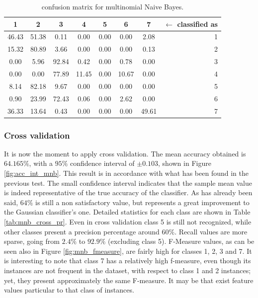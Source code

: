 \documentclass[a4paper, 10pt]{article}
\begin{document}
\begin{table}[H]
\centering
\begin{tabular}{|*{7}{c|}r|}
\hline

1 &2 &3 &4 &5 &6 &7 & $\leftarrow$ classified as \\\hline

\cellcolor{black!15}46.43 &51.38 &0.11 &0.00 &0.00 &0.00 &2.08 & 1 \\\hline

15.32 &\cellcolor{black!15}80.89 &3.66 &0.00 &0.00 &0.00 &0.13 & 2 \\\hline

0.00 &5.96 &\cellcolor{black!15}92.84 &0.42 &0.00 &0.78 &0.00 & 3 \\\hline

0.00 &0.00 &77.89 &\cellcolor{black!15}11.45 &0.00 &10.67 &0.00 & 4 \\\hline

8.14 &82.18 &9.67 &0.00 &\cellcolor{black!15}0.00 &0.00 &0.00 & 5 \\\hline

0.90 &23.99 &72.43 &0.06 &0.00 &\cellcolor{black!15}2.62 &0.00 & 6 \\\hline

36.33 &13.64 &0.43 &0.00 &0.00 &0.00 &\cellcolor{black!15}49.61 & 7 \\\hline

\end{tabular}
\caption{confusion matrix for multinomial Naive Bayes.}
\label{tab:mnb_cf}
\end{table}

\subsubsection{Cross validation}
It is now the moment to apply cross validation. The mean accuracy obtained is $64.165\%$, with a $95\%$ confidence interval of $\pm0.103$, shown in Figure \ref{fig:acc_int_mnb}. This result is in accordance with what has been found in the previous test. The small confidence interval indicates that the sample mean value is indeed representative of the true accuracy of the classifier. As has already been said, $64\%$ is still a non satisfactory value, but represents a great improvement to the Gaussian classifier's one. Detailed statistics for each class are shown in Table \ref{tab:mnb_cross_pr}. Even in cross validation class 5 is still not recognized, while other classes present a precision percentage around $60\%$. Recall values are more sparse, going from $2.4\%$ to $92.9\%$ (excluding class 5). F-Measure values, as can be seen also in Figure \ref{fig:mnb_fmeasure}, are fairly high for classes 1, 2, 3 and 7. It is interesting to note that class 7 has a relatively high f-measure, even though its instances are not frequent in the dataset, with respect to class 1 and 2 instances; yet, they present approximately the same F-measure. It may be that exist feature values particular to that class of instances. 
\end{document}
